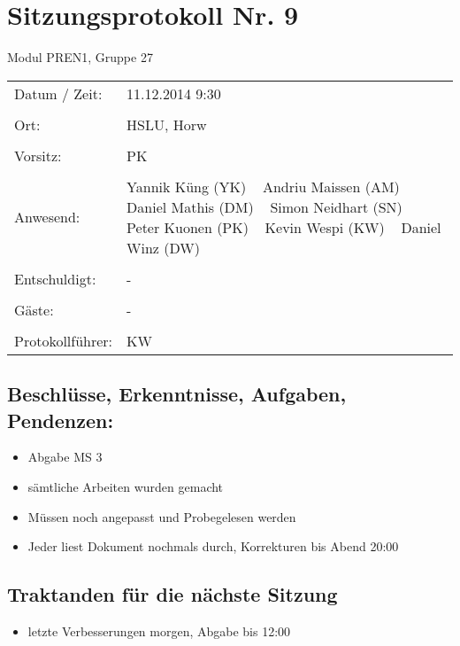 \documentclass[a4paper,10pt,fleqn]{article}
\begin{document}
\section*{Sitzungsprotokoll Nr. 9}
Modul PREN1, Gruppe 27

\begin{longtable}[l]{@{}p{}@{}p{}@{}}
    Datum / Zeit: &
        11.12.2014 9:30
        \\\\
    Ort: &
        HSLU, Horw
        \\\\
    Vorsitz: &
        PK
        \\\\
    Anwesend: &
        Yannik Küng (YK) ~
        Andriu Maissen (AM) ~
        Daniel Mathis (DM) ~
        Simon Neidhart (SN) ~
        Peter Kuonen (PK) ~
        Kevin Wespi (KW) ~
        Daniel Winz (DW) ~
        \\\\
    Entschuldigt: &
        - ~
        \\\\
    Gäste: &
        - ~
        \\\\
    Protokollführer: &
        KW
        \\
\end{longtable}
%
\subsection*{Beschlüsse, Erkenntnisse, Aufgaben, Pendenzen:}
\begin{itemize}
    \item Abgabe MS 3
    \item sämtliche Arbeiten wurden gemacht
    \item Müssen noch angepasst und Probegelesen werden
    \item Jeder liest Dokument nochmals durch, Korrekturen bis Abend 20:00
\end{itemize}
%
\subsection*{Traktanden für die nächste Sitzung}
\begin{itemize}
    \item letzte Verbesserungen morgen, Abgabe bis 12:00
\end{itemize}
%
\end{document}
